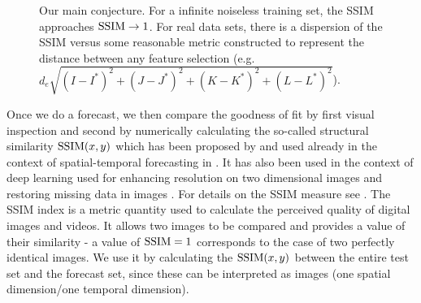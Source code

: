 \documentclass[journal]{IEEEtran}
\begin{document}
\begin{figure}[!htb]
\caption{Our main conjecture. For a infinite noiseless training set, the SSIM approaches $\textnormal{SSIM} \to 1$. For real data sets,
there is a dispersion of the SSIM versus some reasonable metric constructed to
 represent the distance between any feature selection (e.g.\ $d_e\sqrt{(I-I^*)^2+(J-J^*)^2+(K-K^*)^2+(L-L^*)^2}$).
}
\label{conjecture}
\end{figure}

Once we do a forecast, we then compare the goodness of fit by first visual inspection and second by numerically calculating the so-called
structural similarity $\textnormal{SSIM}(x,y)$ which has been proposed by \cite{Wang04imagequality} and used already in the context of spatial-temporal forecasting in \cite{covas2016, covaspeixinhojoao}. It has also been used in the context of deep learning used for enhancing
resolution on two dimensional images \cite{2015arXiv150100092D} and restoring missing data in images \cite{2018arXiv180208369Z}. For details on the SSIM measure see \cite{Wang04imagequality,2009ISPM...26...98W, 2012ITIP...21.1488B}.
The SSIM index is a metric quantity used to calculate the perceived quality of digital images and videos.  It
allows two images to be compared and provides a value of their similarity - a value of $\textnormal{SSIM}=1$ corresponds to the case of two
perfectly identical images. We use it by calculating the $\textnormal{SSIM}(x,y)$ between the entire test set and the forecast set,
since these can be interpreted as images (one spatial dimension/one temporal dimension).
\end{document}
